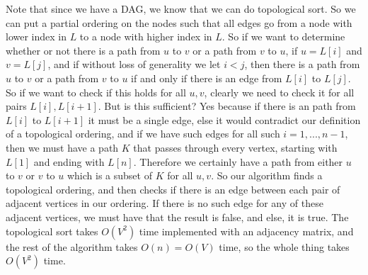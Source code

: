 \documentclass[12pt,oneside,reqno]{amsart}
\makeatletter
\theoremstyle{plain}
\theoremstyle{definition}
\theoremstyle{remark}
\newcommand{\bb}{\vspace{3mm}}
\newenvironment{restoretext}%
    {\@parboxrestore%
     \begin{adjustwidth}{}{\leftmargin}%
    }{\end{adjustwidth}
     }
\makeatother
\begin{document}
\begin{enumerate}[label=\arabic*.]
Note that since we have a DAG, we know that we can do topological sort. So we can put a partial ordering on the nodes such that all edges go from a node with lower index in $L$ to a node with higher index in $L$. So if we want to determine whether or not there is a path from $u$ to $v$ or a path from $v$ to $u$, if $u = L[i]$ and $v = L[j]$, and if without loss of generality we let $i < j$, then there is a path from $u$ to $v$ or a path from $v$ to $u$ if and only if there is an edge from $L[i]$ to $L[j]$. So if we want to check if this holds for all $u,v$, clearly we need to check it for all pairs $L[i],L[i + 1]$. But is this sufficient? Yes because if there is an path from $L[i]$ to $L[i + 1]$ it must be a single edge, else it would contradict our definition of a topological ordering, and if we have such edges for all such $i = 1,...,n - 1$, then we must have a path $K$ that passes through every vertex, starting with $L[1]$ and ending with $L[n]$. Therefore we certainly have a path from either $u$ to $v$ or $v$ to $u$ which is a subset of $K$ for all $u,v$. So our algorithm finds a topological ordering, and then checks if there is an edge between each pair of adjacent vertices in our ordering. If there is no such edge for any of these adjacent vertices, we must have that the result is false, and else, it is true. The topological sort takes $O(V^2)$ time implemented with an adjacency matrix, and the rest of the algorithm takes $O(n) = O(V)$ time, so the whole thing takes $O(V^2)$ time. 




























\begin{comment}
\bb
\begin{restoretext}
\begin{algorithm}[H]\label{alg1}
\KwData{The set of vertices $V$ and edges $E$ of the given graph $G$. }
\KwResult{The list $L$ of the topological ordering of $G$. }
\Begin{
\tcc{Assume $V = \Set{1,2,...,n}$. }
\tcc{global array $visited[1..n]$}
\tcc{global array $topSort[1..n]$}
$visited[1..n] \longleftarrow 0$\;
$topSort[1..n] \longleftarrow 0$\;
\For{$i \longleftarrow 1$ \KwTo $n$}{
	\If{$visited[i] = 0$}{
		dfs$(v)$\;
	}
}
}
\caption{TopSort$(G)$}
\end{algorithm}
\end{restoretext}
\bb


\end{comment}
\end{enumerate}
\end{document}
